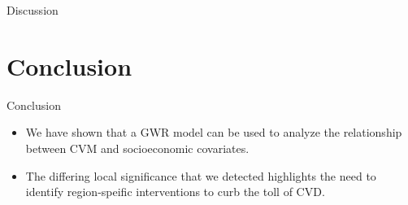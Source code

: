 \documentclass[
  ignorenonframetext,
]{beamer}
\begin{document}
\begin{frame}{Discussion}
\label{discussion-4}
\end{frame}

\section{Conclusion}\label{conclusion}

\begin{frame}{Conclusion}
\label{conclusion-1}
\begin{itemize}
\item
  We have shown that a GWR model can be used to analyze the relationship
  between CVM and socioeconomic covariates.
\item
  The differing local significance that we detected highlights the need
  to identify region-speific interventions to curb the toll of CVD.
\end{itemize}
\end{frame}
\end{document}
